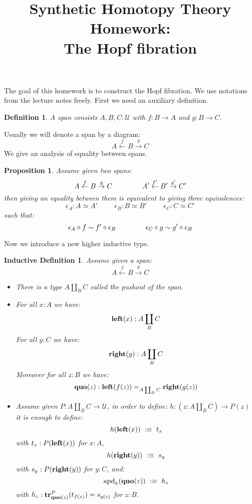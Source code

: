 \documentclass{article}[6pt]%
\title{Synthetic Homotopy Theory Homework: \\ The Hopf fibration}
\date{}
\newcommand{\U}{{\mathcal U}}
\renewcommand{\r}{\rightarrow}
\newcommand{\apd}{\mathrm{apd}}
\newcommand{\tr}{\mathrm{\bf tr}}
\newtheorem{definition}{Definition}
\newtheorem{proposition}{Proposition}
\newtheorem{ind_def}{Inductive Definition}
\newcommand{\lef}{\mathrm{\bf left}}
\newcommand{\righ}{\mathrm{\bf right}}
\newcommand{\quo}{\mathrm{\bf quo}}
\begin{document}
\maketitle



The goal of this homework is to construct the Hopf fibration. We use notations from the lecture notes freely. First we need an auxiliary definition.


\begin{definition}
A span consists $A,B,C:\U$ with $f:B\r A$ and $g:B\r C$.
\end{definition}

Usually we will denote a span by a diagram:
\[A \overset{f}{\leftarrow} B \overset{g}{\r} C\]
We give an analysis of equality between spans.

\begin{proposition}
Assume given two spans:
\[A \overset{f}{\leftarrow} B \overset{g}{\r} C \hspace{1.5cm} A' \overset{f'}{\leftarrow} B' \overset{g'}{\r} C'\]
then giving an equality between them is equivalent to giving three equivalences:
\[\epsilon_A : A \simeq A'  \hspace{1cm} \epsilon_B : B \simeq B'  \hspace{1cm} \epsilon_C : C \simeq C'\]
such that:
\[\epsilon_A \circ f \sim f'\circ \epsilon_B \hspace{1.5cm} \epsilon_C \circ g \sim g'\circ \epsilon_B\]

\end{proposition}

Now we introduce a new higher inductive type.

\begin{ind_def}
Assume given a span: 
\[A \overset{f}{\leftarrow} B \overset{g}{\r} C\]
\begin{itemize}
\item There is a type $A\coprod_B C$ called the pushout of the span.
\item For all $x:A$ we have:
\[\lef(x) : A\coprod_BC\] 
For all $y:C$ we have: 
\[\righ(y) : A\coprod_BC\] 
Moreover for all $z:B$ we have:
\[\quo(z) : \lef(f(z)) =_{A\coprod_BC} \righ(g(z))\]
\item Assume given $P : A\coprod_BC \r \U$, in order to define:
$h : (z:A\coprod_BC) \r P(z)$
it is enough to define:
\[h(\lef(x))\ :\equiv\ t_x\] 
with $t_x:P(\lef(x))$ for $x:A$, 
\[h(\righ(y))\ :\equiv\ s_y\] 
with $s_y:P(\righ(y))$ for $y:C$, and:
\[\apd_h(\quo(z)) \ :\equiv\  h_z\]
with $h_z : \tr^P_{\quo(z)} (t_{f(z)}) = s_{g(z)} $ for $z:B$.
\end{itemize}
\end{ind_def}
\end{document}
